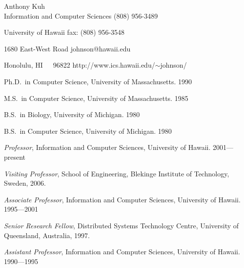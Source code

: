 

\begin{center}
Anthony Kuh \\
Information and Computer Sciences \hfill (808) 956-3489

University of Hawaii              \hfill fax: (808) 956-3548

1680 East-West Road               \hfill johnson@hawaii.edu

Honolulu, HI~~~96822              \hfill http://www.ics.hawaii.edu/$\sim$johnson/

\end{center}

\begin{Professional Preparation}
\item Ph.D.~in Computer Science, University of Massachusetts. 1990 
\item M.S.~in Computer Science, University of Massachusetts.  1985
\item B.S.~in Biology, University of Michigan. 1980
\item B.S.~in Computer Science, University of Michigan. 1980
\end{Professional Preparation}

\begin{Appointments}
\item {\em Professor},  Information and Computer Sciences, University of Hawaii.  2001---present
\item {\em Visiting Professor}, School of Engineering, Blekinge Institute of Technology, Sweden, 2006.
\item {\em Associate Professor},  Information and Computer Sciences, University of Hawaii.  1995---2001
\item {\em Senior Research Fellow},  Distributed Systems Technology Centre, University of Queensland, Australia, 1997.
\item {\em Assistant Professor},   Information and Computer Sciences, University of Hawaii.  1990---1995
\end{Appointments}


